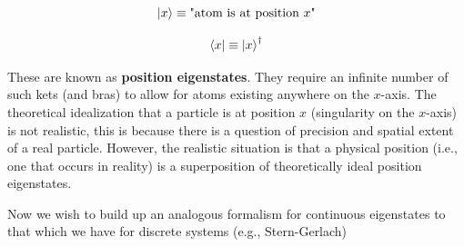 \documentclass[english, 11pt]{article}
\begin{document}
    \[ \left|x\right\rangle \equiv \mbox{"atom is at position $x$"} \]

    \[ \left\langle x\right| \equiv \left|x\right\rangle^\dagger \]

    These are known as \textbf{position eigenstates}. They require an infinite number of such kets (and bras) to allow for atoms existing anywhere on the $x$-axis. The theoretical idealization that a particle is at position $x$ (singularity on the $x$-axis) is not realistic, this is because there is a question of precision and spatial extent of a real particle. However, the realistic situation is that a physical position (i.e., one that occurs in reality) is a superposition of theoretically ideal position eigenstates.
    \newline

    Now we wish to build up an analogous formalism for continuous eigenstates to that which we have for discrete systems (e.g., Stern-Gerlach)
\end{document}
